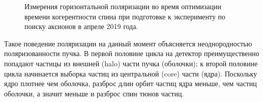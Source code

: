 \begin{figure}[H]\centering
\end{figure}
\begin{figure}[H]\centering
	\caption{Измерения горизонтальной поляризации во время оптимизации времени когерентности спина при подготовке к эксперименту по поиску аксионов в апреле 2019 года.\label{fig:April2019:Polarization}}
\end{figure}

Такое поведение поляризации на данный момент объясняется неоднородностью поляризованности пучка. В первой половине цикла на детектор преимущественно попадают частицы из внешней (halo) части пучка (оболочки); к второй половине цикла начинается выборка частиц из центральной (core) части (ядра). Поскольку ядро плотнее чем оболочка, разброс длин орбит частиц ядра меньше, чем частиц оболочки, а значит меньше и разброс спин тюнов частиц.

